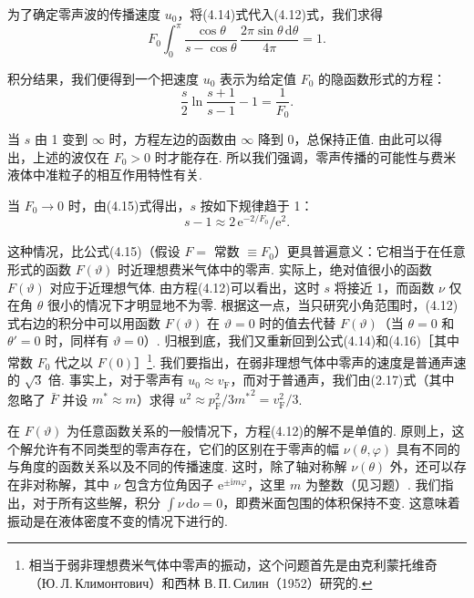 为了确定零声波的传播速度 $u_{0}$，将(4.14)式代入(4.12)式，我们求得
\begin{equation*}
F_{0}\int_{0}^{\pi}\frac{\cos\theta}{s-\cos\theta}\,\frac{2\pi\sin\theta\,\mathrm{d}\theta}{4\pi}=1.
\end{equation*}

积分结果，我们便得到一个把速度 $u_{0}$ 表示为给定值 $F_{0}$ 的隐函数形式的方程：
\begin{equation}
\frac{s}{2}\ln\frac{s+1}{s-1}-1=\frac{1}{F_{0}}.
\end{equation}

当 $s$ 由 1 变到 $\infty$ 时，方程左边的函数由 $\infty$ 降到 0，总保持正值. 由此可以得出，上述的波仅在 $F_{0}>0$ 时才能存在. 所以我们强调，零声传播的可能性与费米液体中准粒子的相互作用特性有关.

当 $F_{0}\to0$ 时，由(4.15)式得出，$s$ 按如下规律趋于 1：
\begin{equation}
s-1\approx2\,\mathrm{e}^{-2/F_{0}}/\mathrm{e}^{2}.
\end{equation}

这种情况，比公式(4.15)（假设 $F=$ 常数 $\equiv F_{0}$）更具普遍意义：它相当于在任意形式的函数 $F(\vartheta)$ 时近理想费米气体中的零声. 实际上，绝对值很小的函数 $F(\vartheta)$ 对应于近理想气体. 由方程(4.12)可以看出，这时 $s$ 将接近 1，而函数 $\nu$ 仅在角 $\theta$ 很小的情况下才明显地不为零. 根据这一点，当只研究小角范围时，(4.12)式右边的积分中可以用函数 $F(\vartheta)$ 在 $\vartheta=0$ 时的值去代替 $F(\vartheta)$（当 $\theta=0$ 和 $\theta'=0$ 时，同样有 $\vartheta=0$）. 归根到底，我们又重新回到公式(4.14)和(4.16)［其中常数 $F_{0}$ 代之以 $F(0)$］\footnote{相当于弱非理想费米气体中零声的振动，这个问题首先是由克利蒙托维奇（Ю.\,Л.\,Климонтович）和西林 В.\,П.\,Силин（1952）研究的.}. 我们要指出，在弱非理想气体中零声的速度是普通声速的 $\sqrt{3}$ 倍. 事实上，对于零声有 $u_{0}\approx v_{\mathrm F}$，而对于普通声，我们由(2.17)式（其中忽略了 $\bar F$ 并设 $m^{*}\approx m$）求得 $u^{2}\approx p_{\mathrm F}^{2}/3{m^{*}}^{2}=v_{\mathrm F}^{2}/3$.

在 $F(\vartheta)$ 为任意函数关系的一般情况下，方程(4.12)的解不是单值的. 原则上，这个解允许有不同类型的零声存在，它们的区别在于零声的幅 $\nu(\theta,\varphi)$ 具有不同的与角度的函数关系以及不同的传播速度. 这时，除了轴对称解 $\nu(\theta)$ 外，还可以存在非对称解，其中 $\nu$ 包含方位角因子 $\mathrm{e}^{\pm\mathrm{i}m\varphi}$，这里 $m$ 为整数（见习题）. 我们指出，对于所有这些解，积分 $\int\nu\,\mathrm{d}o=0$，即费米面包围的体积保持不变. 这意味着振动是在液体密度不变的情况下进行的.

